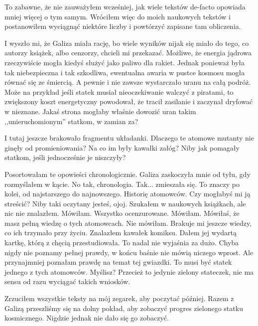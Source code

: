 To zabawne, że nie zauważyłem wcześniej, jak wiele tekstów de-facto opowiada mniej więcej o tym samym. 
Wróciłem więc do moich naukowych tekstów i postanowiłem wyciągnąć niektóre liczby i powtórzyć zapisane tam obliczenia.

I wyszło mi, że Galiza miała rację, bo wiele wyników nijak się miało do tego, co autorzy książek, albo cenzorzy, chcieli mi przekazać.
Możliwe, że energia jądrowa rzeczywiście mogła kiedyś służyć jako paliwo dla rakiet. Jednak ponieważ była tak niebezpieczna i tak szkodliwa, ewentualna awaria w pustce kosmosu mogła równać się ze śmiercią. 
A pewnie i nie zawsze wystarczało uranu na całą podróż. Może na przykład jeśli statek musiał nieoczekiwanie walczyć z piratami, to zwiększony koszt energetyczny powodował, że tracił zasilanie i zaczynał dryfować w nieznane. Jakaś strona mogłaby właśnie dowozić uran takim ,,unieruchomionym'' statkom, w zamian za?

I tutaj jeszcze brakowało fragmentu układanki. Dlaczego te atomowe mutanty nie ginęły od promieniowania? Na co im były kawałki załóg?
Niby jak pomagały statkom, jeśli jednocześnie je niszczyły?

\begin{dialogue}
	\ds{} Posortowałam te opowieści chronologicznie. \dm{} Galiza zaskoczyła mnie od tyłu, gdy rozmyślałem w kącie.
	\ds{} No tak, chronologia. 
	\ds{} Tak... \dm{} zmieszała się. \dm{} To znaczy po kolei, od najstarszego do najnowszego. Historię atomowców.
	\ds{} Czy mogłabyś mi ją streścić?
	\ds{} Niby taki oczytany jesteś, ojoj.
	\ds{} Szukałem w naukowych książkach, ale nic nie znalazłem.
	\ds{} Mówiłam.
	\ds{} Wszystko ocenzurowane.
	\ds{} Mówiłam.
	\ds{} Mówiłaś, że masz pełną wiedzę o tych atomowcach.
	\ds{} Nie mówiłam. Brakuje mi jeszcze wiedzy, co ich trzymało przy życiu.
	\ds{} Znalazłem kawałek komiksu. \dm{} Dałem jej wydartą kartkę, którą z chęcią przestudiowała.
	\ds{} To nadal nie wyjaśnia za dużo.
	\ds{} Chyba nigdy nie poznamy pełnej prawdy, w końcu baśnie nie mówią niczego wprost.
	\ds{} Ale przynajmniej poznałam prawdę na temat tej gwiazdki. To musi być statek jednego z tych atomowców.
	\ds{} Myślisz? Przecież to jedynie zielony stateczek, nie ma sensu od razu wyciągać takich wniosków.
\end{dialogue}

Zrzuciłem wszystkie teksty na mój zegarek, aby poczytać później.
Razem z Galizą przeszliśmy się na dolny pokład, aby zobaczyć progres zielonego statku kosmicznego.
Nigdzie jednak nie dało się go zobaczyć.


















